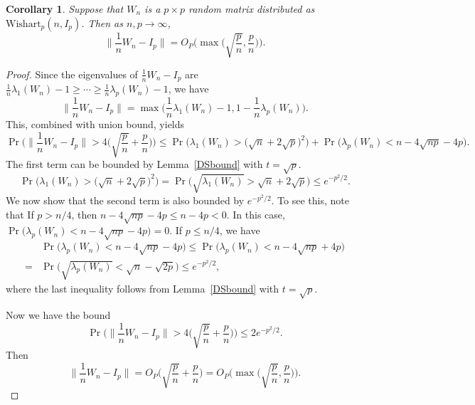 \documentclass[review]{elsarticle}
\theoremstyle{plain}
\newtheorem{corollary}{\quad\quad Corollary}
\theoremstyle{definition}
\theoremstyle{remark}
\begin{document}
{\color{red}
\begin{corollary}\label{corNorm}
Suppose that $W_n$ is a $p \times p$ random matrix distributed as $\mathrm{Wishart}_p(n,I_{p})$. Then as $n,p\to \infty$,
$$
    \|\frac{1}{n}W_n-I_p\|=O_P\Big(\max\big(\sqrt{\frac{p}{n}},\frac{p}{n}\big)\Big).
$$
\end{corollary}
\begin{proof}
    Since the eigenvalues of $\frac{1}{n}W_n-I_p$ are $\frac{1}{n}\lambda_1(W_n)-1\geq\cdots\geq\frac{1}{n}\lambda_p(W_n)-1$, we have
     $$\|\frac{1}{n}W_n-I_p\|=\max\Big(\frac{1}{n}\lambda_1(W_n)-1,1-\frac{1}{n}\lambda_p(W_n)\Big).$$
This, combined with union bound, yields
$$
    \Pr\Big(\|\frac{1}{n}W_n-I_p\|>4\big(\sqrt{\frac{p}{n}}+\frac{p}{n}\big)\Big)
    \leq
    \Pr\Big(\lambda_1(W_n)>\big(\sqrt{n}+2\sqrt{p}\big)^2\Big)+
    \Pr\Big(\lambda_p(W_n)<n-4\sqrt{np}-4p\Big).
$$
    The first term can be bounded by Lemma~\ref{DSbound} with $t=\sqrt{p}$.
    $$
    \Pr\Big(\lambda_1(W_n)>\big(\sqrt{n}+2\sqrt{p}\big)^2\Big)=
    \Pr\Big(\sqrt{\lambda_1(W_n)}>\sqrt{n}+2\sqrt{p}\Big)\leq e^{-p^2/2}.
    $$
    We now show that the second term is also bounded by $e^{-p^2/2}$.
    To see this, note that
    If $p>n/4$, then $n-4\sqrt{np}-4p\leq n-4p<0$. In this case, $\Pr\Big(\lambda_p(W_n)<n-4\sqrt{np}-4p\Big)=0$.
    If $p\leq n/4$, we have
    $$
    \begin{aligned}
        &\Pr\Big(\lambda_p(W_n)<n-4\sqrt{np}-4p\Big)
    \leq
    \Pr\Big(\lambda_p(W_n)<n-4\sqrt{np}+4p\Big)\\
        =&
    \Pr\Big(\sqrt{\lambda_p(W_n)}<\sqrt{n}-\sqrt{2p}\Big)
        \leq e^{-p^2/2},
    \end{aligned}
    $$
    where the last inequality follows from Lemma~\ref{DSbound} with $t=\sqrt{p}$.

    Now we have the bound
    $$
    \Pr\Big(\|\frac{1}{n}W_n-I_p\|>4\big(\sqrt{\frac{p}{n}}+\frac{p}{n}\big)\Big)
    \leq 2 e^{-p^2/2}.
    $$
    Then 
    $$\|\frac{1}{n}W_n-I_p\|=O_P\Big(\sqrt{\frac{p}{n}}+\frac{p}{n}\Big)=O_P\Big(\max\big(\sqrt{\frac{p}{n}},\frac{p}{n}\big)\Big).$$
\end{proof}
}
\end{document}
